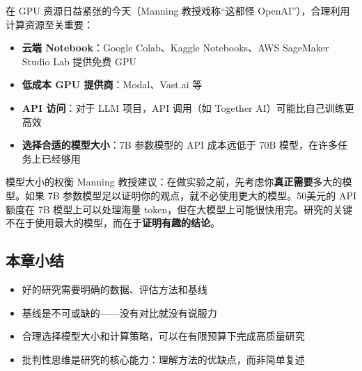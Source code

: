 在 GPU 资源日益紧张的今天（Manning 教授戏称``这都怪 OpenAI''），合理利用计算资源至关重要：

\begin{itemize}
    \item \textbf{云端 Notebook}：Google Colab、Kaggle Notebooks、AWS SageMaker Studio Lab 提供免费 GPU
    \item \textbf{低成本 GPU 提供商}：Modal、Vast.ai 等
    \item \textbf{API 访问}：对于 LLM 项目，API 调用（如 Together AI）可能比自己训练更高效
    \item \textbf{选择合适的模型大小}：7B 参数模型的 API 成本远低于 70B 模型，在许多任务上已经够用
\end{itemize}

\begin{knowledgebox}{模型大小的权衡}
Manning 教授建议：在做实验之前，先考虑你\textbf{真正需要}多大的模型。如果 7B 参数模型足以证明你的观点，就不必使用更大的模型。50美元的 API 额度在 7B 模型上可以处理海量 token，但在大模型上可能很快用完。研究的关键不在于使用最大的模型，而在于\textbf{证明有趣的结论}。
\end{knowledgebox}

\subsection{本章小结}

\begin{itemize}
    \item 好的研究需要明确的数据、评估方法和基线
    \item 基线是不可或缺的——没有对比就没有说服力
    \item 合理选择模型大小和计算策略，可以在有限预算下完成高质量研究
    \item 批判性思维是研究的核心能力：理解方法的优缺点，而非简单复述
\end{itemize}


